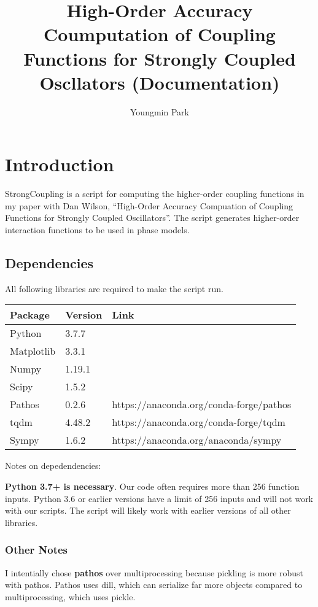 \documentclass[english,a4paper,oneside]{article}
\title{High-Order Accuracy Coumputation of Coupling Functions for Strongly
Coupled Oscllators (Documentation)}
\author{Youngmin Park}
\date{}
\begin{document}
\maketitle

{
\hypersetup{linkcolor=black}
\setcounter{tocdepth}{4}
\tableofcontents
}
\section{Introduction}\label{introduction}

StrongCoupling is a script for computing the higher-order coupling
functions in my paper with Dan Wilson, ``High-Order Accuracy Compuation
of Coupling Functions for Strongly Coupled Oscillators''. The script
generates higher-order interaction functions to be used in phase models.

\subsection{Dependencies}\label{dependencies}

All following libraries are required to make the script run.

\begin{longtable}[]{@{}lll@{}}
\toprule
Package & Version & Link\tabularnewline
\midrule
\endhead
Python & 3.7.7 &\tabularnewline
Matplotlib & 3.3.1 &\tabularnewline
Numpy & 1.19.1 &\tabularnewline
Scipy & 1.5.2 &\tabularnewline
Pathos & 0.2.6 & https://anaconda.org/conda-forge/pathos\tabularnewline
tqdm & 4.48.2 & https://anaconda.org/conda-forge/tqdm\tabularnewline
Sympy & 1.6.2 & https://anaconda.org/anaconda/sympy\tabularnewline
\bottomrule
\end{longtable}

Notes on depedendencies:

\textbf{Python 3.7+ is necessary}. Our code often requires more than 256
function inputs. Python 3.6 or earlier versions have a limit of 256
inputs and will not work with our scripts. The script will likely work
with earlier versions of all other libraries.

\subsubsection{Other Notes}\label{other-notes}

I intentially chose \textbf{pathos} over multiprocessing because
pickling is more robust with pathos. Pathos uses dill, which can
serialize far more objects compared to multiprocessing, which uses
pickle.
\end{document}
